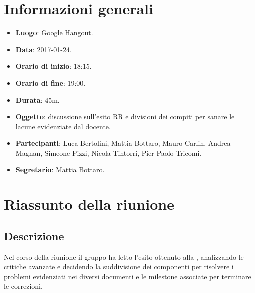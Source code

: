 \documentclass[a4paper,titlepage]{article}
\begin{document}
\maketitle
\begin{diario}
\end{diario}
\newpage
\tableofcontents

\newpage
\section{Informazioni generali}
\label{sec:Informazioni}

\begin{itemize}
  \item \textbf{Luogo}: Google Hangout.
  \item \textbf{Data}: 2017-01-24.
  \item \textbf{Orario di inizio}: 18:15.
  \item \textbf{Orario di fine}: 19:00.
  \item \textbf{Durata}: 45m.
  \item \textbf{Oggetto}: discussione sull'esito RR e divisioni dei compiti per sanare le lacune evidenziate dal docente.
  \item \textbf{Partecipanti}: Luca Bertolini, Mattia Bottaro, Mauro Carlin, Andrea Magnan, Simeone Pizzi, Nicola Tintorri, Pier Paolo Tricomi.
  \item \textbf{Segretario}: Mattia Bottaro.

\end{itemize}
\section{Riassunto della riunione}
\label{sec:RiassuntoRiunione}
 \subsection{Descrizione}
Nel corso della riunione il gruppo \GRUPPO{} ha letto l'esito ottenuto alla \RR{}, analizzando le critiche avanzate e decidendo la suddivisione dei componenti per risolvere i problemi evidenziati nei diversi documenti e le milestone associate per terminare le correzioni.  
\end{document}
